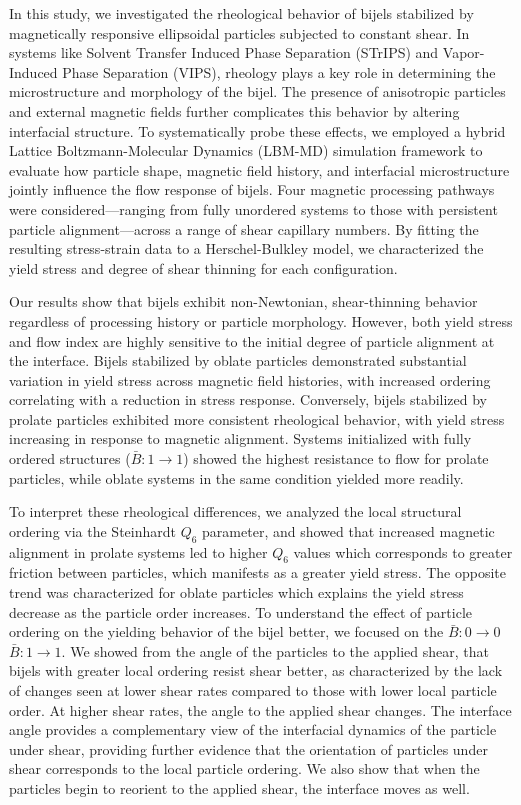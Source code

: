 In this study, we investigated the rheological behavior of bijels stabilized by magnetically responsive ellipsoidal particles subjected to constant shear. 
In systems like Solvent Transfer Induced Phase Separation (STrIPS) and Vapor-Induced Phase Separation (VIPS), rheology plays a key role in determining the
microstructure and morphology of the bijel. The presence of anisotropic particles and external magnetic fields further complicates this behavior 
by altering interfacial structure. To systematically probe these effects, we employed a hybrid Lattice Boltzmann-Molecular Dynamics (LBM-MD) simulation 
framework to evaluate how particle shape, magnetic field history, and interfacial microstructure jointly influence the flow response of bijels. 
Four magnetic processing pathways were considered—ranging from fully unordered systems to those with persistent particle alignment—across a range of 
shear capillary numbers. By fitting the resulting stress-strain data to a Herschel-Bulkley model, we characterized the yield stress and degree of shear 
thinning for each configuration.

Our results show that bijels exhibit non-Newtonian, shear-thinning behavior regardless of processing history or particle morphology. However, both yield stress 
and flow index are highly sensitive to the initial degree of particle alignment at the interface. Bijels stabilized by oblate particles demonstrated substantial 
variation in yield stress across magnetic field histories, with increased ordering correlating with a reduction in stress response. Conversely, bijels stabilized 
by prolate particles exhibited more consistent rheological behavior, with yield stress increasing in response to magnetic alignment. Systems initialized with 
fully ordered structures ($\bar{B}:1 \rightarrow 1$) showed the highest resistance to flow for prolate particles, while oblate systems in the same condition 
yielded more readily.

To interpret these rheological differences, we analyzed the local structural ordering via the Steinhardt $Q_6$ parameter, and showed that increased magnetic alignment in 
prolate systems led to higher $Q_6$ values which corresponds to greater friction between particles, which manifests as a greater yield stress. The opposite trend was
characterized for oblate particles which explains the yield stress decrease as the particle order increases. To understand the effect of particle ordering 
on the yielding behavior of the bijel better, we focused on the $\bar{B}:0 \rightarrow 0$ $\bar{B}:1 \rightarrow 1$. We showed from the angle of the particles to the applied
shear, that bijels with greater local ordering resist shear better, as characterized by the lack of changes seen at lower shear rates compared to those with lower local
particle order. At higher shear rates, the angle to the applied shear changes. The interface angle provides a complementary view of the interfacial dynamics of the particle 
under shear, providing further evidence that the orientation of particles under shear corresponds to the local particle ordering. We also show that when the particles begin
to reorient to the applied shear, the interface moves as well. 

